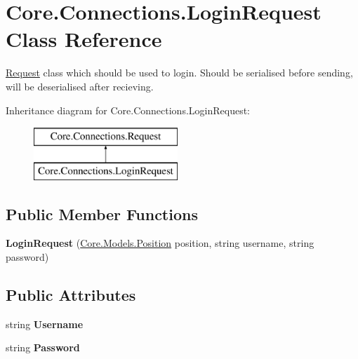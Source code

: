 \hypertarget{classCore_1_1Connections_1_1LoginRequest}{\section{Core.\-Connections.\-Login\-Request Class Reference}
\label{classCore_1_1Connections_1_1LoginRequest}
}


\hyperlink{classCore_1_1Connections_1_1Request}{Request} class which should be used to login. Should be serialised before sending, will be deserialised after recieving.  


Inheritance diagram for Core.\-Connections.\-Login\-Request\-:\begin{figure}[H]
\begin{center}
\leavevmode
\includegraphics[height=2.000000cm]{classCore_1_1Connections_1_1LoginRequest}
\end{center}
\end{figure}
\subsection*{Public Member Functions}
\begin{DoxyCompactItemize}
\item 
\hypertarget{classCore_1_1Connections_1_1LoginRequest_a5358029b8a55dfbcdd7567f1b812d399}{{\bfseries Login\-Request} (\hyperlink{classCore_1_1Models_1_1Position}{Core.\-Models.\-Position} position, string username, string password)}\label{classCore_1_1Connections_1_1LoginRequest_a5358029b8a55dfbcdd7567f1b812d399}

\end{DoxyCompactItemize}
\subsection*{Public Attributes}
\begin{DoxyCompactItemize}
\item 
\hypertarget{classCore_1_1Connections_1_1LoginRequest_aead391392278a11f91e5570e44942f91}{string {\bfseries Username}}\label{classCore_1_1Connections_1_1LoginRequest_aead391392278a11f91e5570e44942f91}

\item 
\hypertarget{classCore_1_1Connections_1_1LoginRequest_af3a2a4f734dcca3404687bfb8844b2ee}{string {\bfseries Password}}\label{classCore_1_1Connections_1_1LoginRequest_af3a2a4f734dcca3404687bfb8844b2ee}

\end{DoxyCompactItemize}


